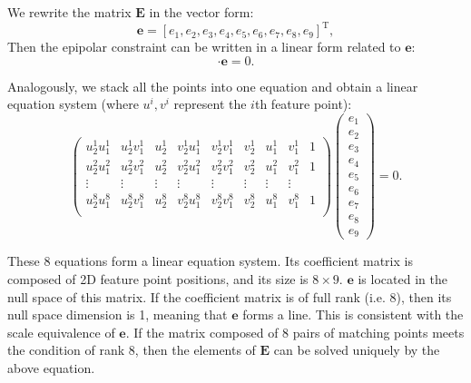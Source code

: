 We rewrite the matrix $\mathbf{E}$ in the vector form:
\[
\mathbf{e}= [e_{1},e_{2},e_{3},e_{4},e_{5},e_{6},e_{7},e_{8},e_{9}]^{\mathrm{T}},
\]
Then the epipolar constraint can be written in a linear form related to $\mathbf{e}$:
\begin{equation}
[u_{2}u_{1},u_{2}v_{1},u_{2},v_{2}u_{1},v_{2}v_{1},v_{2},u_{1},v_{1},1] \cdot  \mathbf{e}=0.
\end{equation}

Analogously, we stack all the points into one equation and obtain a linear equation system (where $u^i, v^i$ represent the $i$th feature point): 
\begin{equation}
\label{Eq:eight-point}
\begin{pmatrix}
u_{2}^{1}u_{1}^{1}& u_{2}^{1}v_{1}^{1}& u_{2}^{1}& v_{2}^{1}u_{1}^{1}& v_{2}^{1}v_{1}^{1}& v_{2}^{1} &u_{1}^{1} &v_{1}^{1}&1\\
u_{2}^{2}u_{1}^{2}& u_{2}^{2}v_{1}^{2}& u_{2}^{2}& v_{2}^{2}u_{1}^{2}& v_{2}^{2}v_{1}^{2}& v_{2}^{2} &u_{1}^{2} &v_{1}^{2}&1\\
\vdots & \vdots & \vdots & \vdots & \vdots & \vdots & \vdots & \vdots \\
u_{2}^{8}u_{1}^{8}& u_{2}^{8}v_{1}^{8}& u_{2}^{8}& v_{2}^{8}u_{1}^{8}& v_{2}^{8}v_{1}^{8}& v_{2}^{8} &u_{1}^{8}&v_{1}^{8}&1\\
\end{pmatrix}
\begin{pmatrix}
e_{1}\\ e_{2}\\ e_{3}\\  e_{4}\\ e_{5}\\ e_{6}\\ e_{7}\\ e_{8}\\ e_{9}  
\end{pmatrix}
=0.
\end{equation}

These 8 equations form a linear equation system. Its coefficient matrix is composed of 2D feature point positions, and its size is $8 \times 9$. $\mathbf{e}$ is located in the null space of this matrix. If the coefficient matrix is of full rank (i.e. 8), then its null space dimension is 1, meaning that $\mathbf{e}$ forms a line. This is consistent with the scale equivalence of $\mathbf{e}$. If the matrix composed of 8 pairs of matching points meets the condition of rank 8, then the elements of $\mathbf{E}$ can be solved uniquely by the above equation.

